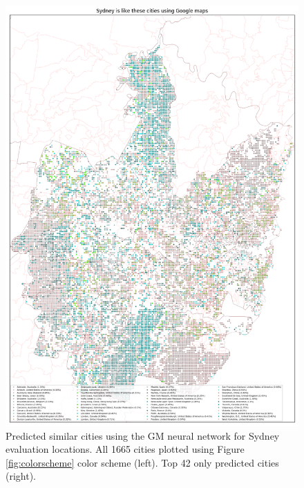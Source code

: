 \documentclass[sageh,times]{sagej}
\begin{document}
\begin{figure}[!htbp]
\includegraphics[scale=0.20]{Images/SydneyOverallAbrev_maps.png}  
\caption{Predicted similar cities using the GM neural network for Sydney evaluation locations. All 1665 cities plotted using Figure \ref{fig:colorscheme} color scheme (left). Top 42 only predicted cities (right).}    
 \label{fig:sydmaps}  
\end{figure} 
\end{document}
